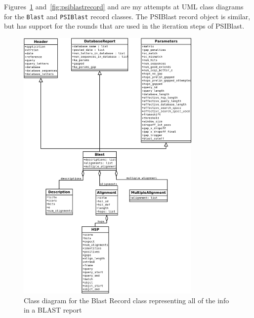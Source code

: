 \begin{latexonly}
Figures~\ref{fig:blastrecord} and~\ref{fig:psiblastrecord} and are my attempts at UML class diagrams for the \verb|Blast| and \verb|PSIBlast| record classes.
The PSIBlast record object is similar, but has support for the rounds that are used in the iteration steps of PSIBlast.

\begin{figure}[htbp]
\centering
\includegraphics[width=0.8\textwidth]{images/BlastRecord.png}
\caption{Class diagram for the Blast Record class representing all of the info in a BLAST report}
\label{fig:blastrecord}
\end{figure}


\end{latexonly}
